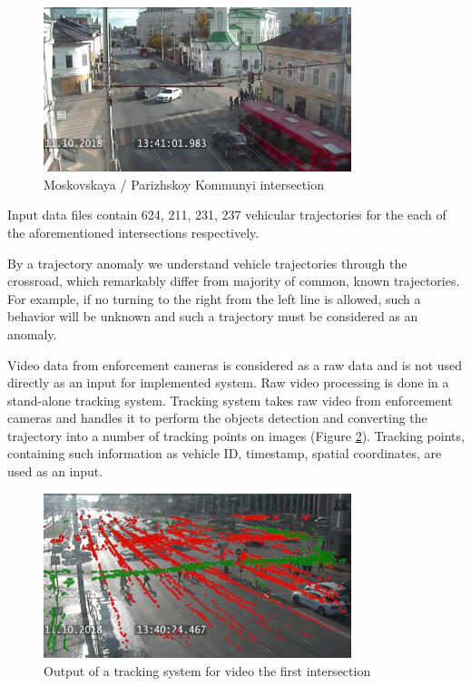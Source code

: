 \begin{figure}[!htb]
	\centering{}
	\includegraphics[width=0.8\textwidth]{images/is-4.jpg}
	\caption{Moskovskaya / Parizhskoy Kommunyi intersection}
	\label{fig:is_4}
\end{figure}

Input data files contain 624, 211, 231, 237 vehicular trajectories for the each of the aforementioned intersections respectively.

By a trajectory anomaly we understand vehicle trajectories through the crossroad, which remarkably differ from majority of common, known trajectories. For example, if no turning to the right from the left line is allowed, such a behavior will be unknown and such a trajectory must be considered as an anomaly.

Video data from enforcement cameras is considered as a raw data and is not used directly as an input for implemented system. Raw video processing is done in a stand-alone tracking system. Tracking system takes raw video from enforcement cameras and handles it to perform the objects detection and converting the trajectory into a number of tracking points on images (Figure \ref{fig:tr_p}). Tracking points, containing such information as vehicle ID, timestamp, spatial coordinates, are used as an input.

\begin{figure}[!htb]
	\centering{}
	\includegraphics[width=0.8\textwidth]{images/tr-p.png}
	\caption{Output of a tracking system for video the first intersection}
	\label{fig:tr_p}
\end{figure}

